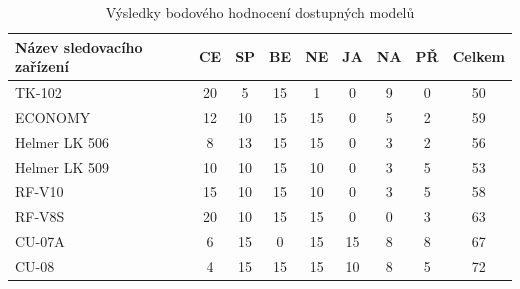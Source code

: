 \documentclass[FM,BP]{tulthesis}  %
\begin{document}
\renewcommand{\arraystretch}{1.5}
\begin{table}[H]
\begin{center}
\begin{tabular}{| l | c | c| c | c | c | c | c | c |}
\hline
Název sledovacího zařízení & CE & SP & BE & NE & JA & NA & PŘ & Celkem\\
\hline
\hline
TK-102 & 20 & 5 & 15 & 1 & 0 & 9 & 0 & 50\\
\hline
ECONOMY & 12 & 10 & 15 & 15 & 0 & 5 & 2 & 59\\
\hline
Helmer LK 506 & 8 & 13 & 15 & 15 & 0 & 3 & 2 & 56\\
\hline
Helmer LK 509 & 10 & 10 & 15 & 10 & 0 & 3 & 5 & 53\\
\hline
RF-V10 & 15 & 10 & 15 & 10 & 0 & 3 & 5 & 58\\
\hline
RF-V8S & 20 & 10 & 15 & 15 & 0 & 0 & 3 & 63\\
\hline
CU-07A & 6 & 15 & 0 & 15 & 15 & 8 & 8 & 67\\
\hline
CU-08 & 4 & 15 & 15 & 15 & 10 & 8 & 5 & 72\\
\hline
\end{tabular}
\end{center}
\caption{Výsledky bodového hodnocení dostupných modelů}
\end{table}
\end{document}
